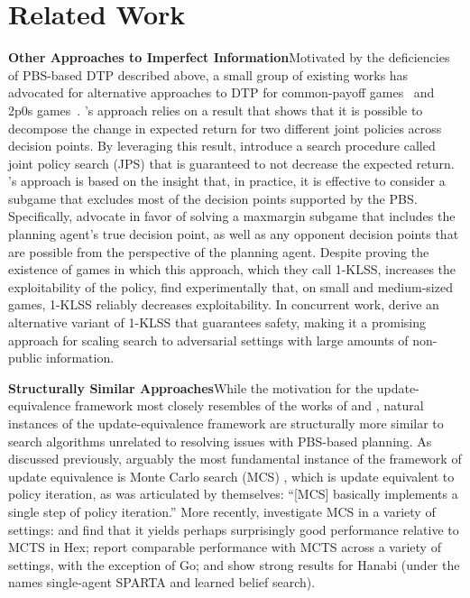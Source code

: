 \documentclass{article} %
\theoremstyle{plain}
\theoremstyle{definition}
\theoremstyle{remark}
\begin{document}
\section{Related Work}

\textbf{Other Approaches to Imperfect Information}\quad Motivated by the deficiencies of PBS-based DTP described above, a small group of existing works has advocated for alternative approaches to DTP for common-payoff games~\citep{jps} and 2p0s games~\citep{Zhang2021SubgameSW}.
\citet{jps}'s approach relies on a result that shows that it is possible to decompose the change in expected return for two different joint policies across decision points.
By leveraging this result, \citet{jps} introduce a search procedure called joint policy search (JPS) that is guaranteed to not decrease the expected return.
\citet{Zhang2021SubgameSW}'s approach is based on the insight that, in practice, it is effective to consider a subgame that excludes most of the decision points supported by the PBS.
Specifically, \citet{Zhang2021SubgameSW} advocate in favor of solving a maxmargin subgame \citep{maxmargin} that includes the planning agent's true decision point, as well as any opponent decision points that are possible from the perspective of the planning agent.
Despite proving the existence of games in which this approach, which they call 1-KLSS, increases the exploitability of the policy, \citet{Zhang2021SubgameSW} find experimentally that, on small and medium-sized games, 1-KLSS reliably decreases exploitability.
In concurrent work, \citet{liu23} derive an alternative variant of 1-KLSS that guarantees safety, making it a promising approach for scaling search to adversarial settings with large amounts of non-public information.

\textbf{Structurally Similar Approaches}\quad While the motivation for the update-equivalence framework most closely resembles of the works of \citet{jps} and \citet{Zhang2021SubgameSW}, natural instances of the update-equivalence framework are structurally more similar to search algorithms unrelated to resolving issues with PBS-based planning.
As discussed previously, arguably the most fundamental instance of the framework of update equivalence is Monte Carlo search (MCS) \citep{mcs}, which is update equivalent to policy iteration, as was articulated by \citet{mcs} themselves: ``[MCS] basically implements a single step of policy iteration.''
More recently, \citet{pgs,exit-thesis,hamrick2021on,lerer2020improving,lbs} investigate MCS in a variety of settings:
\citet{pgs} and \citet{exit-thesis} find that it yields perhaps surprisingly good performance relative to MCTS in Hex;
\citet{hamrick2021on} report comparable performance with MCTS across a variety of settings, with the exception of Go;
\citet{lerer2020improving} and \citet{lbs} show strong results for Hanabi (under the names single-agent SPARTA and learned belief search).
\end{document}
